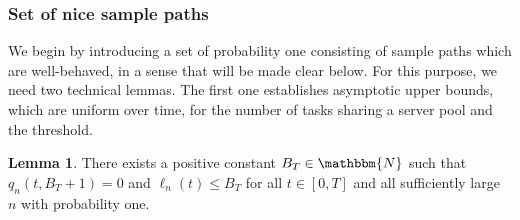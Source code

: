 \documentclass[a4paper, 12pt]{article}
\theoremstyle{definition}
\newtheorem{lemma}[theorem]{Lemma}
\newcommand{\N}{\mathbbm{N}}
\begin{document}
\subsubsection{Set of nice sample paths}
\label{subsub: set of nice sample paths}

We begin by introducing a set of probability one consisting of sample paths which are well-behaved, in a sense that will be made clear below. For this purpose, we need two technical lemmas. The first one establishes asymptotic upper bounds, which are uniform over time, for the number of tasks sharing a server pool and the threshold.

\begin{lemma}
	\label{lem: upper bound for number of tasks and threshold}
	There exists a positive constant $B_T \in \N$ such that $q_n(t, B_T + 1) = 0$ and $\ell_n(t) \leq B_T$ for all $t \in [0, T]$ and all sufficiently large $n$ with probability one.
\end{lemma}
\end{document}
